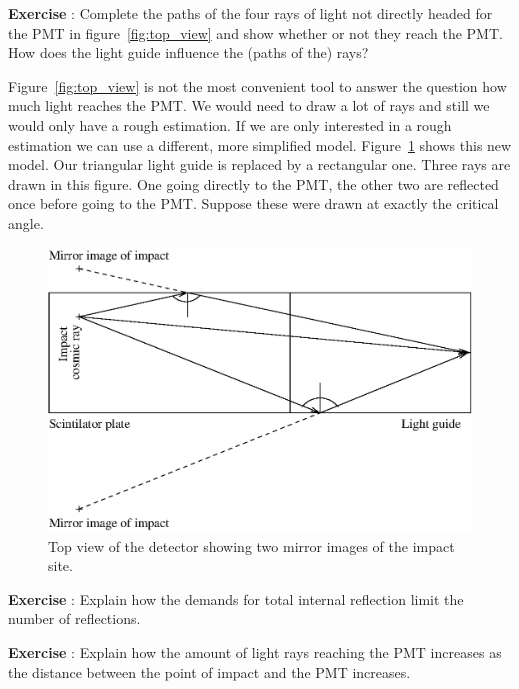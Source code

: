 \documentclass[12pt,a4paper]{article}
\numberwithin{equation}{section}
\numberwithin{figure}{section}
\newcounter{Exercise}
\numberwithin{table}{section}
\begin{document}
\begin{shaded}
\textbf{Exercise \theExercise {}} : Complete the paths of the four rays of light not directly headed for the PMT in figure~\ref{fig:top_view} and show whether or not they reach the PMT. How does the light guide influence the (paths of the) rays? \end{shaded}

Figure~\ref{fig:top_view} is not the most convenient tool to answer the question how much light reaches the PMT. We would need to draw a lot of rays and still we would only have a rough estimation. If we are only interested in a rough estimation we can use a different, more simplified model. Figure~\ref{fig:top_view_simp} shows this new model. Our triangular light guide is replaced by a rectangular one. Three rays are drawn in this figure. One going directly to the PMT, the other two are reflected once before going to the PMT. Suppose these were drawn at exactly the critical angle.

\begin{figure}\begin{center}
\includegraphics[scale=1]{top_view_simp.eps}
\caption{Top view of the detector showing two mirror images of the impact site.}\label{fig:top_view_simp}
\end{center}\end{figure}

\begin{shaded}
\textbf{Exercise \theExercise {}} : Explain how the demands for total internal reflection limit the number of reflections.\end{shaded}
\begin{shaded}
\textbf{Exercise \theExercise {}} : Explain how the amount of light rays reaching the PMT increases as the distance between the point of impact and the PMT increases.\end{shaded}
\end{document}
